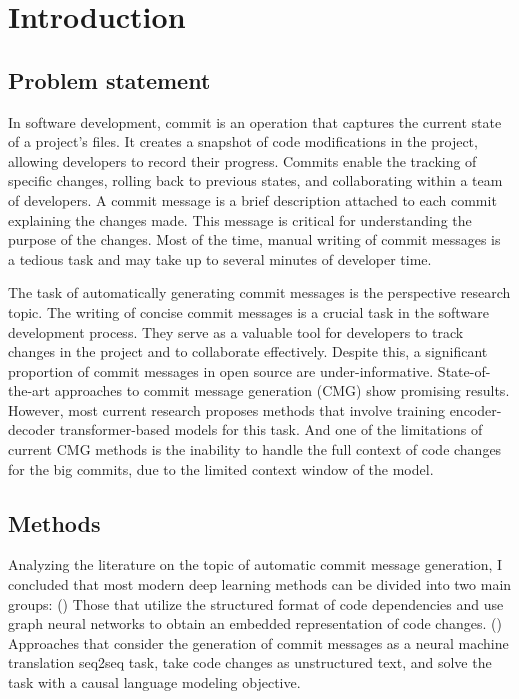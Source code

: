 \chapter{Introduction}\label{chap:intro}

\section{Problem statement}
In software development, commit is an operation that captures the current state of a project's files. It creates a snapshot of code modifications in the project, allowing developers to record their progress. Commits enable the tracking of specific changes, rolling back to previous states, and collaborating within a team of developers.
A commit message is a brief description attached to each commit explaining the changes made. This message is critical for understanding the purpose of the changes. Most of the time, manual writing of commit messages is a tedious task and may take up to several minutes of developer time. 

The task of automatically generating commit messages is the perspective research topic. The writing of concise commit messages is a crucial task in the software development process. They serve as a valuable tool for developers to track changes in the project and to collaborate effectively. Despite this, a significant proportion of commit messages in open source are under-informative. State-of-the-art approaches to commit message generation (CMG) show promising results. However, most current research proposes methods that involve training encoder-decoder transformer-based models for this task. And one of the limitations of current CMG methods is the inability to handle the full context of code changes for the big commits, due to the limited context window of the model.

\section{Methods}
Analyzing the literature on the topic of automatic commit message generation, I concluded that most modern deep learning methods can be divided into two main groups: () Those that utilize the structured format of code dependencies and use graph neural networks to obtain an embedded representation of code changes. () Approaches that consider the generation of commit messages as a neural machine translation seq2seq task, take code changes as unstructured text, and solve the task with a causal language modeling objective. 

